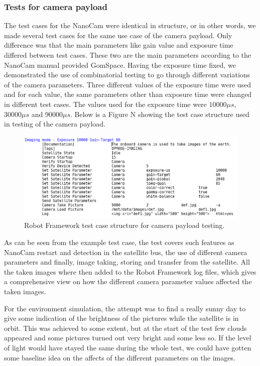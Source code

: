 \documentclass[english,12pt,a4paper,pdftex,elec,utf8]{aaltothesis}
\begin{document}
\subsubsection{Tests for camera payload}
The test cases for the NanoCam were identical in structure, or in other words, we made several test cases for the same use case of the camera payload. Only difference was that the main parameters like gain value and exposure time differed between test cases. These two are the main parameters according to the NanoCam manual provided GomSpace. Having the exposure time fixed, we demonstrated the use of combinatorial testing to go through different variations of the camera parameters. Three different values of the exposure time were used and for each value, the same parameters other than exposure time were changed in different test cases. The values used for the exposure time were ${10 000 \mu s}$, ${30 000 \mu s}$ and ${90 000 \mu s}$.  Below is a Figure N showing the test case structure used in testing of the camera payload.\par
\begin{figure}[h!]
\includegraphics[scale=0.5]{cameracase}
\caption{Robot Framework test case structure for camera payload testing.}
\end{figure}
As can be seen from the example test case, the test covers such features as NanoCam restart and detection in the satellite bus, the use of different camera parameters and finally, image taking, storing and transfer from the satellite. All the taken images where then added to the Robot Framework log files, which gives a comprehensive view on how the different camera parameter values affected the taken images.\par 
For the environment simulation, the attempt was to find a really sunny day to give some indication of the brightness of the pictures while the satellite is in orbit. This was achieved to some extent, but at the start of the test few clouds appeared and some pictures turned out very bright and some less so. If the level of light would have stayed the same during the whole test, we could have gotten some baseline idea on the affects of the different parameters on the images.\par
\end{document}
